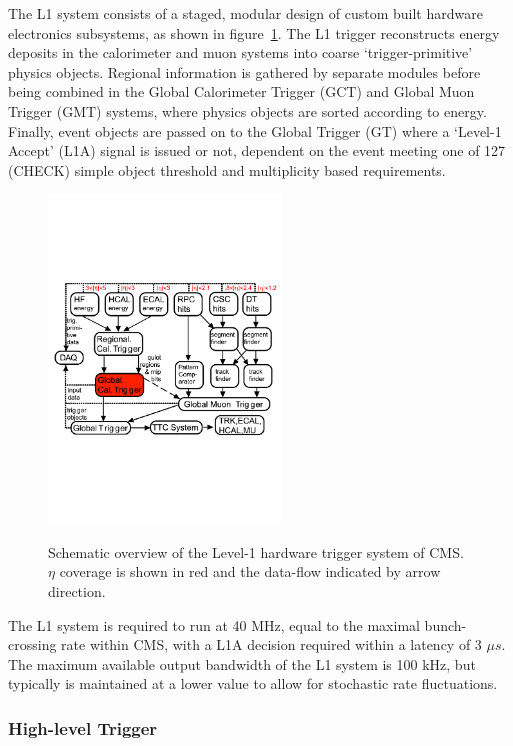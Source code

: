 The L1 system consists of a staged, modular design of custom built hardware 
electronics subsystems, as shown in figure~\ref{fig:l1_diagram}. 
The L1 trigger reconstructs energy deposits in the calorimeter and muon systems
into coarse `trigger-primitive' physics objects.
Regional information is gathered by separate modules 
before being combined in the Global Calorimeter Trigger (GCT) and Global Muon 
Trigger (GMT) systems, where physics objects are sorted according to energy. 
Finally, event objects are passed on to the Global Trigger (GT) where a 
`Level-1 Accept' (L1A) signal is issued or not, dependent on the event meeting 
one of 127 (CHECK) simple object threshold and multiplicity based requirements.

\begin{figure}[ht!]
  \centering
  \includegraphics[width = 0.55\textwidth]{Figs/machine/L1_diagram.pdf}
  \label{fig:l1_diagram}
  \caption{Schematic overview of the Level-1 hardware trigger system of CMS. $
  \eta$ coverage is shown in red and the data-flow indicated by arrow 
  direction.}
\end{figure}

The L1 system is required to run at 40 MHz, equal to the maximal bunch-crossing
rate within CMS, with a L1A decision required within a latency of 3 $\mu s$. The
maximum available output bandwidth of the L1 system is 100 kHz, but typically is
maintained at a lower value to allow for stochastic rate fluctuations.

\subsubsection{High-level Trigger}

